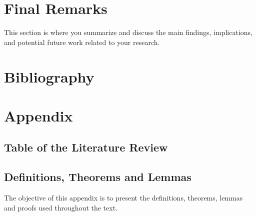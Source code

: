 \documentclass[
	12pt, 
	]{article}
\numberwithin{equation}{section}
\theoremstyle{definition}
\theoremstyle{plain}
\theoremstyle{plain}
\theoremstyle{plain}
\begin{document}
\lipsum[1]


\section{Final Remarks}

This section is where you summarize and discuss the main findings, implications, and potential future work related to your research.

\lipsum[1]

\newpage


\section*{Bibliography}

{	
	\onehalfspacing
	\printbibliography[heading=bibintoc]
}

\newpage


\appendix

\section{Appendix}


\subsection{Table of the Literature Review}

\lipsum[1]


\subsection{Definitions, Theorems and Lemmas}

The objective of this appendix is to present the definitions, theorems, lemmas and proofs used throughout the text.
\end{document}
